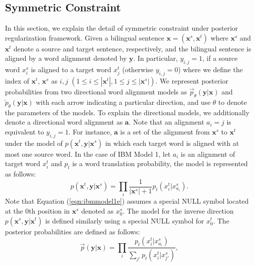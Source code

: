 \documentclass[english]{jnlp_1.4}
\begin{document}
\subsection{Symmetric Constraint}

In this section, we explain the detail of symmetric constraint under posterior regularization framework.
Given a bilingual sentence $\boldsymbol{x} = (\boldsymbol{x}^s,\boldsymbol{x}^t)$ where $\boldsymbol{x}^s$ and $\boldsymbol{x}^t$ denote a source and target sentence,
respectively, and the bilingual sentence is aligned by a word alignment denoted by $\boldsymbol{y}$.
In particular, $y_{i,j}=1$, if a source word $x^{s}_{i}$ is aligned to a target word $x^{t}_{j}$ (otherwise $y_{i,j}=0$) where we define the index of $\boldsymbol{x}^t$, $\boldsymbol{x}^s$ as $i,j$ $(1 \leq i \leq |\boldsymbol{x}^t|, 1 \leq j \leq |\boldsymbol{x}^s|)$.
We represent posterior probabilities from two directional word alignment models as $\overrightarrow{p}_{\theta}(\boldsymbol{y}|\boldsymbol{x})$ and $\overleftarrow{p}_{\theta}(\boldsymbol{y}|\boldsymbol{x})$  with each arrow indicating a particular direction,
and use $\theta$ to denote the parameters of the models.
To explain the directional models, we additionally denote a directional word alignment as $\boldsymbol{a}$.
Note that an alignment $a_{i}=j$ is equivalent to $y_{i,j}=1$.
For instance, $\boldsymbol{a}$ is a set of the alignment from $\boldsymbol{x}^s$ to $\boldsymbol{x}^t$ under the model of  $p(\boldsymbol{x}^t, \boldsymbol{y} | \boldsymbol{x}^s)$ in which each target word is aligned with at most one source word.
In the case of IBM Model 1, let $a_{i}$ is an alignment of target word $x^{t}_{i}$ and $p_{t}$ is a word translation probability, the model is represented as follows:
\begin{equation}
 \label{eqn:ibmmodel1e}
 p(\boldsymbol{x}^t,\boldsymbol{y}|\boldsymbol{x}^s) = \prod_{i}\frac{1}{| \boldsymbol{x}^s | + 1}p_t(x^{t}_i|x^{s}_{a_i}).
\end{equation}
Note that Equation (\ref{eqn:ibmmodel1e}) assumes a special NULL symbol located at the 0th position in $\boldsymbol{x}^s$ denoted as $x_{0}^{s}$.
The model for the inverse direction $p(\boldsymbol{x}^{s}, \boldsymbol{y} | \boldsymbol{x}^{t})$  is defined similarly using a special NULL symbol for $x_{0}^{t}$.
The posterior probabilities are defined as follows:
\begin{equation}
 \label{eqn:ibmmodel1m}
\overrightarrow{p}(\boldsymbol{y} | \boldsymbol{x}) = \prod_{i}\frac{p_t(x^{t}_{i} |x^{s}_{a_{i}}) }
{\sum_{j'} p_t(x^{t}_{i}|x^{s}_{j'}) },
\end{equation}
\end{document}
